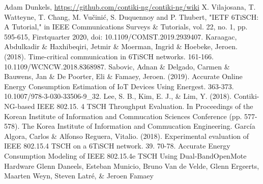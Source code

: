 \documentclass[conference]{IEEEtran}
\begin{document}





\begin{thebibliography}{00}
 Adam Dunkels, \url {https://github.com/contiki-ng/contiki-ng/wiki}
 X. Vilajosana, T. Watteyne, T. Chang, M. Vučinić, S. Duquennoy and P. Thubert, "IETF 6TiSCH: A Tutorial," in IEEE Communications Surveys \& Tutorials, vol. 22, no. 1, pp. 595-615, Firstquarter 2020, doi: 10.1109/COMST.2019.2939407.
 Karaagac, Abdulkadir \& Haxhibeqiri, Jetmir \& Moerman, Ingrid \& Hoebeke, Jeroen. (2018). Time-critical communication in 6TiSCH networks. 161-166. 10.1109/WCNCW.2018.8368987. 
 Sabovic, Adnan \& Delgado, Carmen \& Bauwens, Jan \& De Poorter, Eli \& Famaey, Jeroen. (2019). Accurate Online Energy Consumption Estimation of IoT Devices Using Energest. 363-373. 10.1007/978-3-030-33506-9\_32. 
 Lee, S. B., Kim, E. J., \& Lim, Y. (2018). Contiki-NG-based IEEE 802.15. 4 TSCH Throughput Evaluation. In Proceedings of the Korean Institute of Information and Commucation Sciences Conference (pp. 577-578). The Korea Institute of Information and Commucation Engineering.
 García Algora, Carlos \& Alfonso Reguera, Vitalio. (2018). Experimental evaluation of IEEE 802.15.4 TSCH on a 6TiSCH network. 39. 70-78.
 Accurate Energy Consumption Modeling of IEEE 802.15.4e TSCH Using Dual-BandOpenMote Hardware
Glenn Daneels, Esteban Municio, Bruno Van de Velde, Glenn Ergeerts, Maarten Weyn, Steven Latré, \& Jeroen Famaey

\end{thebibliography}
\end{document}
